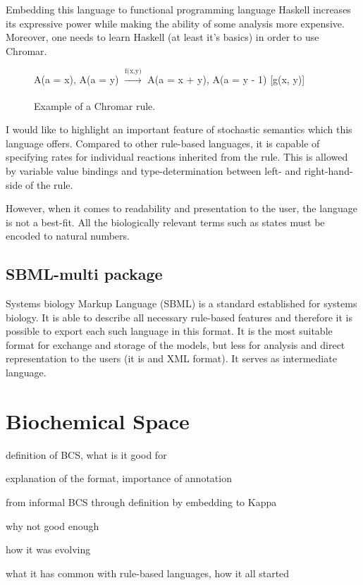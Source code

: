 \documentclass[12pt]{fithesis2}
\begin{document}
Embedding this language to functional programming language Haskell increases its expressive power while making the ability of some analysis more expensive. Moreover, one needs to learn Haskell (at least it's basics) in order to use Chromar.

\begin{figure}
\begin{center}
A(a = x), A(a = y) $\xrightarrow[]{\text{f(x,y)}}$ A(a = x + y), A(a = y - 1) [g(x, y)]
\end{center}
\caption{Example of a Chromar rule.}\label{chromar-rule}
\end{figure}

I would like to highlight an important feature of stochastic semantics which this language offers. Compared to other rule-based languages, it is capable of specifying rates for individual reactions inherited from the rule. This is allowed by variable value bindings and type-determination between left- and right-hand-side of the rule.

However, when it comes to readability and presentation to the user, the language is not a best-fit. All the biologically relevant terms such as states must be encoded to natural numbers.

\subsection{SBML-multi package}

Systems biology Markup Language (SBML) is a standard established for systems biology. It is able to describe all necessary rule-based features and therefore it is possible to export each such language in this format. It is the most suitable format for exchange and storage of the models, but less for analysis and direct representation to the users (it is and XML format). It serves as intermediate language. 

\section{Biochemical Space}

definition of BCS, what is it good for

explanation of the format, importance of annotation

from informal BCS through definition by embedding to Kappa

why not good enough

how it was evolving

what it has common with rule-based languages, how it all started
\end{document}
